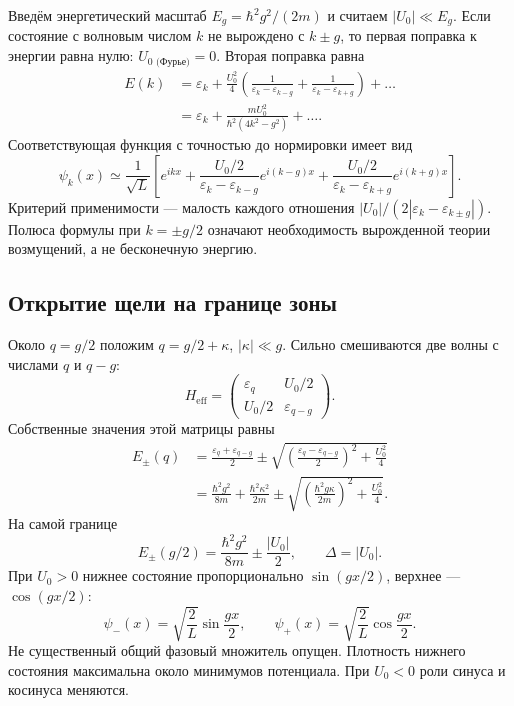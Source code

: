 \documentclass[../final.tex]{subfiles}
\begin{document}
Введём энергетический масштаб $E_g=\hbar^2g^2/(2m)$ и считаем
$|U_0|\ll E_g$. Если состояние с волновым числом $k$
не вырождено с $k\pm g$, то первая поправка к энергии равна нулю:
$U_{0\text{ (Фурье)}}=0$. Вторая поправка равна
\begin{align*}
    E(k)&=\varepsilon_k+\frac{U_0^2}{4}
       \left(\frac1{\varepsilon_k-\varepsilon_{k-g}}
             +\frac1{\varepsilon_k-\varepsilon_{k+g}}\right)+\ldots\\
       &=\varepsilon_k+
          \frac{mU_0^2}{\hbar^2(4k^2-g^2)}+\ldots.
\end{align*}
Соответствующая функция с точностью до нормировки имеет вид
\[
    \psi_k(x)\simeq\frac1{\sqrt L}\left[
       e^{ikx}+\frac{U_0/2}{\varepsilon_k-\varepsilon_{k-g}}e^{i(k-g)x}
       +\frac{U_0/2}{\varepsilon_k-\varepsilon_{k+g}}e^{i(k+g)x}
    \right].
\]
Критерий применимости --- малость каждого отношения
$|U_0|/(2|\varepsilon_k-\varepsilon_{k\pm g}|)$.
Полюса формулы при $k=\pm g/2$ означают необходимость
вырожденной теории возмущений, а не бесконечную энергию.

\subsection*{Открытие щели на границе зоны}

Около $q=g/2$ положим $q=g/2+\kappa$, $|\kappa|\ll g$.
Сильно смешиваются две волны с числами $q$ и $q-g$:
\[
    H_{\mathrm{eff}}=
    \begin{pmatrix}
        \varepsilon_q&U_0/2\\
        U_0/2&\varepsilon_{q-g}
    \end{pmatrix}.
\]
Собственные значения этой матрицы равны
\begin{align*}
    E_\pm(q)&=\frac{\varepsilon_q+\varepsilon_{q-g}}2
       \pm\sqrt{\left(\frac{\varepsilon_q-\varepsilon_{q-g}}2\right)^2
                     +\frac{U_0^2}{4}}\\
       &=\frac{\hbar^2g^2}{8m}+\frac{\hbar^2\kappa^2}{2m}
          \pm\sqrt{\left(\frac{\hbar^2g\kappa}{2m}\right)^2
                         +\frac{U_0^2}{4}}.
\end{align*}
На самой границе
\[
    E_\pm(g/2)=\frac{\hbar^2g^2}{8m}\pm\frac{|U_0|}{2},
    \qquad \Delta=|U_0|.
\]
При $U_0>0$ нижнее состояние пропорционально
$\sin(gx/2)$, верхнее --- $\cos(gx/2)$:
\[
    \psi_-(x)=\sqrt{\frac2L}\sin\frac{gx}{2},\qquad
    \psi_+(x)=\sqrt{\frac2L}\cos\frac{gx}{2}.
\]
Не существенный общий фазовый множитель опущен.
Плотность нижнего состояния максимальна около минимумов потенциала.
При $U_0<0$ роли синуса и косинуса меняются.
\end{document}
